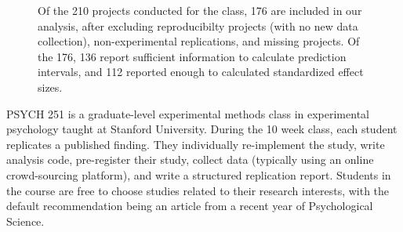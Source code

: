 \documentclass[
  english,
  a4paper,
]{article}
\begin{document}
\begin{figure}[ht]
    
\caption{Of the 210 projects conducted for the class, 176 are included in our analysis, after excluding reproducibilty projects (with no new data collection), non-experimental replications, and missing projects. Of the 176, 136 report sufficient information to calculate prediction intervals, and 112 reported enough to calculated standardized effect sizes. }\label{fig:prisma}
\end{figure}

PSYCH 251 is a graduate-level experimental methods class in experimental psychology taught at Stanford University. During the 10 week class, each student replicates a published finding. They individually re-implement the study, write analysis code, pre-register their study, collect data (typically using an online crowd-sourcing platform), and write a structured replication report. Students in the course are free to choose studies related to their research interests, with the default recommendation being an article from a recent year of Psychological Science.
\end{document}
